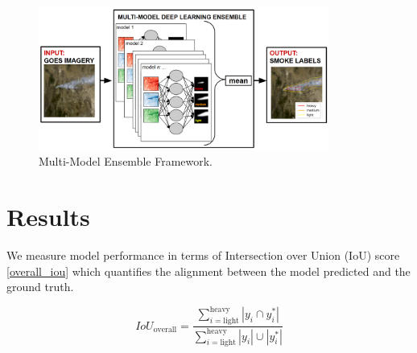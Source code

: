 \documentclass{article}
\begin{document}
\begin{figure}[h]
    \centering
    \includegraphics[width=0.85\textwidth]{ensemble_framework.png}
    \caption{Multi-Model Ensemble Framework.}
    \label{fig:ensemble_framework}
\end{figure}


\section{Results}
We measure model performance in terms of Intersection over Union (IoU) score \ref{overall_iou} which quantifies the alignment between the model predicted and the ground truth. 


\begin{equation} \label{overall_iou}
    IoU_{\text{overall}} = \frac{\sum\limits_{i=\text{light}}^{\text{heavy}}|y_{i}\cap y^*_{i}|}{\sum\limits_{i=\text{light}}^{\text{heavy}}|y_{i}|\cup|y^*_{i}|}
\end{equation}
\end{document}
